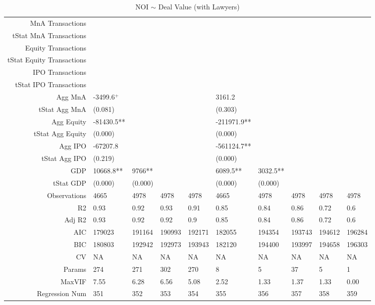 \begin{table}[ht]
\begin{tabular}{rlllllllll}
  MnA Transactions &  &  &  &  &  &  &  &  &  \\ 
  tStat MnA Transactions &  &  &  &  &  &  &  &  &  \\ 
  Equity Transactions &  &  &  &  &  &  &  &  &  \\ 
  tStat Equity Transactions &  &  &  &  &  &  &  &  &  \\ 
  IPO Transactions &  &  &  &  &  &  &  &  &  \\ 
  tStat IPO Transactions &  &  &  &  &  &  &  &  &  \\ 
  Agg MnA & -3499.6$^{+}$ &  &  &  & 3161.2 &  &  &  &  \\ 
  tStat Agg MnA & (0.081) &  &  &  & (0.303) &  &  &  &  \\ 
  Agg Equity & -81430.5** &  &  &  & -211971.9** &  &  &  &  \\ 
  tStat Agg Equity & (0.000) &  &  &  & (0.000) &  &  &  &  \\ 
  Agg IPO & -67207.8 &  &  &  & -561124.7** &  &  &  &  \\ 
  tStat Agg IPO & (0.219) &  &  &  & (0.000) &  &  &  &  \\ 
  GDP & 10668.8** & 9766** &  &  & 6089.5** & 3032.5** &  &  &  \\ 
  tStat GDP & (0.000) & (0.000) &  &  & (0.000) & (0.000) &  &  &  \\ 
  Observations & 4665 & 4978 & 4978 & 4978 & 4665 & 4978 & 4978 & 4978 & 4978 \\ 
  R2 & 0.93 & 0.92 & 0.93 & 0.91 & 0.85 & 0.84 & 0.86 & 0.72 & 0.6 \\ 
  Adj R2 & 0.93 & 0.92 & 0.92 & 0.9 & 0.85 & 0.84 & 0.86 & 0.72 & 0.6 \\ 
  AIC & 179023 & 191164 & 190993 & 192171 & 182055 & 194354 & 193743 & 194612 & 196284 \\ 
  BIC & 180803 & 192942 & 192973 & 193943 & 182120 & 194400 & 193997 & 194658 & 196303 \\ 
  CV & NA & NA & NA & NA & NA & NA & NA & NA & NA \\ 
  Params & 274 & 271 & 302 & 270 & 8 & 5 & 37 & 5 & 1 \\ 
  MaxVIF & 7.55 & 6.28 & 6.56 & 5.08 & 2.52 & 1.33 & 1.37 & 1.33 & 0.00 \\ 
  Regression Num & 351 & 352 & 353 & 354 & 355 & 356 & 357 & 358 & 359 \\ 
   \hline
\end{tabular}
\caption{NOI $\sim$ Deal Value (with Lawyers)} 
\end{table}
